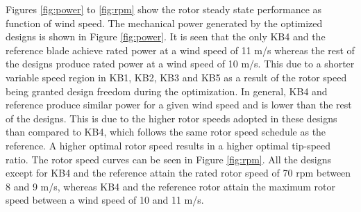 Figures \ref{fig:power} to \ref{fig:rpm} show the rotor steady state performance as function of wind speed. The mechanical power generated by the optimized designs is shown in Figure \ref{fig:power}. It is seen that the only KB4 and the reference blade achieve rated power at a wind speed of 11 m/s whereas the rest of the designs produce rated power at a wind speed of 10 m/s. This due to a shorter variable speed region in KB1, KB2, KB3 and KB5 as a result of the rotor speed being granted design freedom during the optimization. In general, KB4 and reference produce similar power for a given wind speed and is lower than the rest of the designs. This is due to the higher rotor speeds adopted in these designs than compared to KB4, which follows the same rotor speed schedule as the reference. A higher optimal rotor speed results in a higher optimal tip-speed ratio. The rotor speed curves can be seen in Figure \ref{fig:rpm}. All the designs except for KB4 and the reference attain the rated rotor speed of 70 rpm between 8 and 9 m/s, whereas KB4 and the reference rotor attain the maximum rotor speed between a wind speed of 10 and 11 m/s. 

